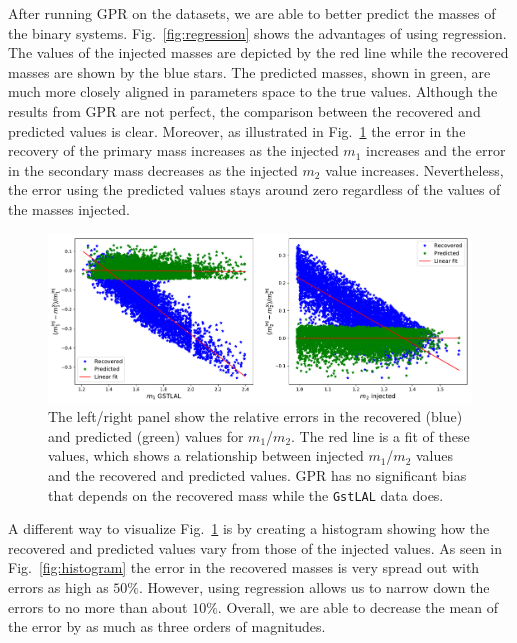 \documentclass[aps,prd,twocolumn,superscriptaddress,preprintnumbers,floatfix,nofootinbib]{revtex4-2}
\begin{document}
After running GPR on the datasets, we are able to better predict the masses of the binary 
systems. Fig.~\ref{fig:regression} shows the advantages of using regression. The values of 
the injected masses are depicted by the red line while the recovered masses are shown 
by the blue stars. The predicted masses, shown in green, are much more closely aligned in 
parameters space to the true values. Although the results from GPR are not perfect, the 
comparison between the recovered and predicted values is clear. Moreover, as illustrated in 
Fig.~\ref{fig:fits} the error in the recovery of the primary mass increases as 
the injected $m_1$ increases and the error in the secondary mass decreases as 
the injected $m_2$ value increases. Nevertheless, the error using the predicted values 
stays around zero regardless of the values of the masses injected. 

\begin{figure}[!h]
	\centering
	\includegraphics[width=\linewidth]{m1_m2_errors_and_fits}
	\caption{%
	 		The left/right panel show the relative errors in the recovered (blue) and 
			predicted (green) values for $m_1$/$m_2$. The red line is a fit of these values, which 
			shows a relationship between injected $m_1$/$m_2$ values and the recovered and 
			predicted values. GPR has no significant bias that depends on the recovered mass 
			while the \texttt{GstLAL} data does.}
 	\label{fig:fits}
\end{figure}

A different way to visualize Fig.~\ref{fig:fits} is by creating a histogram showing how the 
recovered and predicted values vary from those of the injected values. As seen in 
Fig.~\ref{fig:histogram} the error in the recovered masses is very spread out with errors as high 
as $50\%$. However, using regression allows us to narrow down the errors to no more than 
about $10\%$. Overall, we are able to decrease the mean of the error by as much as three 
orders of magnitudes.
\end{document}
